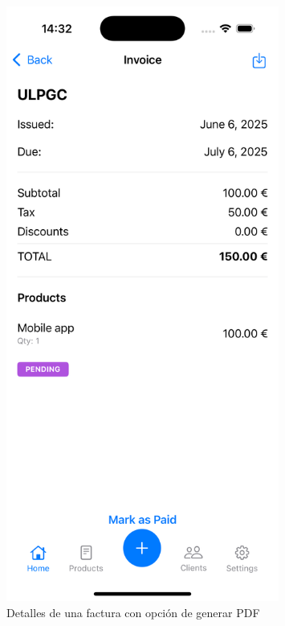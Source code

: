 \begin{large}
\begin{figure}[H]
\begin{minipage}[t]{0.45\textwidth}
    \includegraphics[width=0.8\textwidth]{Ilustraciones/ios_invoicedetails.png}
    \caption{Detalles de una factura con opción de generar PDF}
    \label{fig:invoice_details}
  \end{minipage}
\end{figure}


\end{large}
